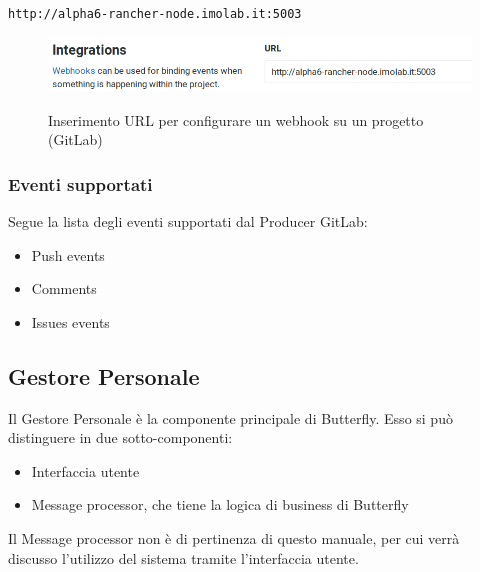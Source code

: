 \begin{center}
    \texttt{http://alpha6-rancher-node.imolab.it:5003}
\end{center}

\begin{figure}[H]
    \centering
    \includegraphics[width=\textwidth]{img/webhook-gitlab.png}\\
    \caption[Webhook, GitLab]{Inserimento URL per configurare un webhook su un progetto (GitLab)}
\end{figure}


\subsubsection{Eventi supportati}
Segue la lista degli eventi supportati dal Producer GitLab:
\begin{itemize}
    \item Push events
    \item Comments
    \item Issues events
\end{itemize}



\subsection{Gestore Personale}

Il Gestore Personale è la componente principale di Butterfly. %
Esso si può distinguere in due sotto-componenti:

\begin{itemize}
    \item Interfaccia utente
    \item Message processor, che tiene la logica di business di Butterfly
\end{itemize}

Il Message processor non è di pertinenza di questo manuale, per cui verrà discusso l'utilizzo del sistema tramite
l'interfaccia utente.


